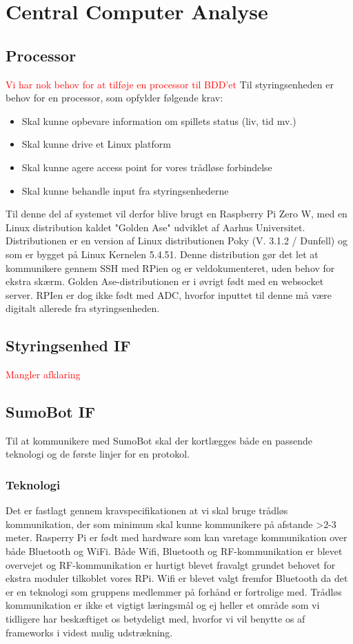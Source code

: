 \section{Central Computer Analyse}

\subsection{Processor}
\textcolor{red}{Vi har nok behov for at tilføje en processor til BDD'et}
Til styringsenheden er behov for en processor, som opfylder følgende krav: 
\begin{itemize}
\item Skal kunne opbevare information om spillets status (liv, tid mv.) 
\item Skal kunne drive et Linux platform
\item Skal kunne agere access point for vores trådløse forbindelse 
\item Skal kunne behandle input fra styringsenhederne
\end{itemize}

Til denne del af systemet vil derfor blive brugt en Raspberry Pi Zero W, med en Linux distribution kaldet "Golden Ase" udviklet af Aarhus Universitet. Distributionen er en version af Linux distributionen Poky (V. 3.1.2 / Dunfell) og som er bygget på Linux Kernelen 5.4.51. Denne distribution gør det let at kommunikere gennem SSH med RPien og er veldokumenteret, uden behov for ekstra skærm. Golden Ase-distributionen er i øvrigt født med en websocket server. 
RPIen er dog ikke født med ADC, hvorfor inputtet til denne må være digitalt allerede fra styringsenheden. 

\subsection{Styringsenhed IF}
\textcolor{red}{Mangler afklaring}

\subsection{SumoBot IF}
Til at kommunikere med SumoBot skal der kortlægges både en passende teknologi og de første linjer for en protokol. 

\subsubsection{Teknologi}
Det er fastlagt gennem kravspecifikationen at vi skal bruge trådløs kommunikation, der som minimum skal kunne kommunikere på afstande >2-3 meter. Rasperry Pi er født med hardware som kan varetage kommunikation over både Bluetooth og WiFi. 
Både Wifi, Bluetooth og RF-kommunikation er blevet overvejet og RF-kommunikation er hurtigt blevet fravalgt grundet behovet for ekstra moduler tilkoblet vores RPi. Wifi er blevet valgt fremfor Bluetooth da det er en teknologi som gruppens medlemmer på forhånd er fortrolige med. Trådløs kommunikation er ikke et vigtigt læringsmål og ej heller et område som vi tidligere har beskæftiget os betydeligt med, hvorfor vi vil benytte os af frameworks i videst mulig udstrækning. 

